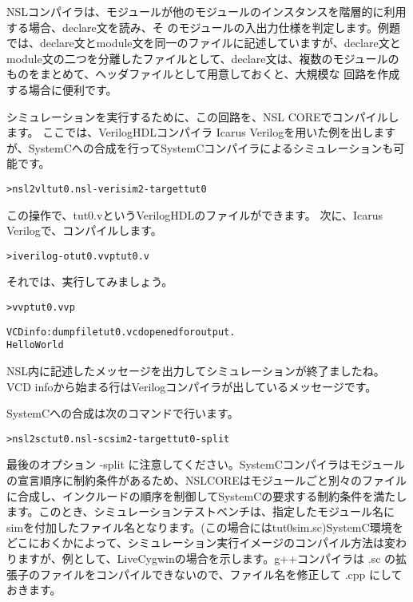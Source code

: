 NSLコンパイラは、モジュールが他のモジュールのインスタンスを階層的に利用する場合、declare文を読み、そ のモジュールの入出力仕様を判定します。例題では、declare文とmodule文を同一のファイルに記述していますが、declare文と module文の二つを分離したファイルとして、declare文は、複数のモジュールのものをまとめて、ヘッダファイルとして用意しておくと、大規模な 回路を作成する場合に便利です。

シミュレーションを実行するために、この回路を、NSL COREでコンパイルします。
ここでは、VerilogHDLコンパイラ Icarus Verilogを用いた例を出しますが、SystemCへの合成を行ってSystemCコンパイラによるシミュレーションも可能です。

\begin{reviewcmd}
\begin{alltt}
\textgreater{} nsl2vl tut0.nsl -verisim2 -target tut0
\end{alltt}
\end{reviewcmd}

この操作で、tut0.vというVerilogHDLのファイルができます。
次に、Icarus Verilogで、コンパイルします。

\begin{reviewcmd}
\begin{alltt}
\textgreater{} iverilog -o tut0.vvp tut0.v
\end{alltt}
\end{reviewcmd}

それでは、実行してみましょう。

\begin{reviewcmd}
\begin{alltt}
\textgreater{} vvp tut0.vvp

VCD info: dumpfile tut0.vcd opened for output.
Hello World
\end{alltt}
\end{reviewcmd}

NSL内に記述したメッセージを出力してシミュレーションが終了ましたね。VCD infoから始まる行はVerilogコンパイラが出しているメッセージです。

SystemCへの合成は次のコマンドで行います。

\begin{reviewcmd}
\begin{alltt}
\textgreater{} nsl2sc tut0.nsl -scsim2 -target tut0 -split
\end{alltt}
\end{reviewcmd}

最後のオプション -split に注意してください。SystemCコンパイラはモジュールの宣言順序に制約条件があるため、NSLCOREはモジュールごと別々のファイルに合成し、インクルードの順序を制御してSystemCの要求する制約条件を満たします。このとき、シミュレーションテストベンチは、指定したモジュール名に\textunderscore{}simを付加したファイル名となります。(この場合にはtut0\textunderscore{}sim.sc)SystemC環境をどこにおくかによって、シミュレーション実行イメージのコンパイル方法は変わりますが、例として、LiveCygwinの場合を示します。g++コンパイラは .sc の拡張子のファイルをコンパイルできないので、ファイル名を修正して .cpp にしておきます。

